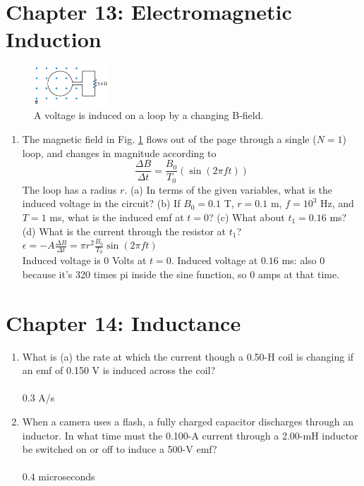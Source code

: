 \documentclass[10pt]{article}
\begin{document}
\section{Chapter 13: Electromagnetic Induction}

\begin{figure}[hb]
\centering
\includegraphics[width=0.25\textwidth]{loopsine.png}
\caption{\label{fig:chap13_1} A voltage is induced on a loop by a changing B-field.}
\end{figure}

\begin{enumerate}
\item The magnetic field in Fig. \ref{fig:chap13_1} flows out of the page through a single ($N=1$) loop, and changes in magnitude according to
\begin{equation}
\frac{\Delta B}{\Delta t} = \frac{B_0}{T_0}\left(\sin(2\pi f t)\right)
\end{equation}
The loop has a radius $r$.  (a) In terms of the given variables, what is the induced voltage in the circuit? (b) If $B_0 = 0.1$ T, $r = 0.1$ m, $f = 10^3$ Hz, and $T = 1$ ms, what is the induced emf at $t=0$?  (c) What about $t_1 = 0.16$ ms? (d) What is the current through the resistor at $t_1$? \\

$\epsilon = - A \frac{\Delta B}{\Delta t} = \pi r^2 \frac{B_0}{T_0}\sin(2\pi ft)$ \\
Induced voltage is 0 Volts at $t=0$.  Induced voltage at $0.16$ ms: also 0 because it's 320 times pi inside the sine function, so 0 amps at that time.

\end{enumerate}

\section{Chapter 14: Inductance}

\begin{enumerate}
\item What is (a) the rate at which the current though a 0.50-H coil is changing if an emf of 0.150 V is induced across the coil? \\ 
\\
0.3 A/s
\item When a camera uses a flash, a fully charged capacitor discharges through an inductor. In what time must the 0.100-A current through a 2.00-mH inductor be switched on or off to induce a 500-V emf? \\ \\
0.4 microseconds
\end{enumerate}
\end{document}
